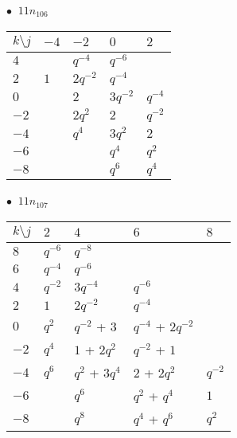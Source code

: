\begin{minipage}{\linewidth}
$\bullet\ $ $11n_{106}$ \vspace{0.5em} \\
\begin{tabular}{l|llll}
$k \setminus j$ & $-4$ & $-2$ & $0$ & $2$ \\
\hline
$4$ &  & $q^{-4}$ & $q^{-6}$ &  \\
$2$ & $1$ & $2q^{-2}$ & $q^{-4}$ &  \\
$0$ &  & $2$ & $3q^{-2}$ & $q^{-4}$ \\
$-2$ &  & $2q^{2}$ & $2$ & $q^{-2}$ \\
$-4$ &  & $q^{4}$ & $3q^{2}$ & $2$ \\
$-6$ &  &  & $q^{4}$ & $q^{2}$ \\
$-8$ &  &  & $q^{6}$ & $q^{4}$ \\
\end{tabular}
\vspace{2em}
\end{minipage}
%
\begin{minipage}{\linewidth}
$\bullet\ $ $11n_{107}$ \vspace{0.5em} \\
\begin{tabular}{l|llll}
$k \setminus j$ & $2$ & $4$ & $6$ & $8$ \\
\hline
$8$ & $q^{-6}$ & $q^{-8}$ &  &  \\
$6$ & $q^{-4}$ & $q^{-6}$ &  &  \\
$4$ & $q^{-2}$ & $3q^{-4}$ & $q^{-6}$ &  \\
$2$ & $1$ & $2q^{-2}$ & $q^{-4}$ &  \\
$0$ & $q^{2}$ & $q^{-2}$ + $3$ & $q^{-4}$ + $2q^{-2}$ &  \\
$-2$ & $q^{4}$ & $1$ + $2q^{2}$ & $q^{-2}$ + $1$ &  \\
$-4$ & $q^{6}$ & $q^{2}$ + $3q^{4}$ & $2$ + $2q^{2}$ & $q^{-2}$ \\
$-6$ &  & $q^{6}$ & $q^{2}$ + $q^{4}$ & $1$ \\
$-8$ &  & $q^{8}$ & $q^{4}$ + $q^{6}$ & $q^{2}$ \\
\end{tabular}
\vspace{2em}
\end{minipage}
%

